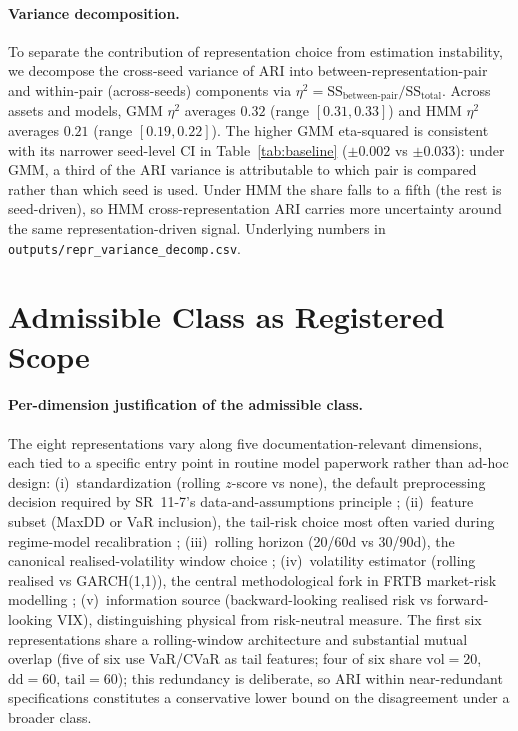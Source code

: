 \documentclass[preprint,12pt,authoryear]{elsarticle}
\begin{document}
\paragraph{Variance decomposition.}
\label{app:variance_decomp}
To separate the contribution of representation choice from estimation instability, we decompose the cross-seed variance of ARI into between-representation-pair and within-pair (across-seeds) components via $\eta^2 = \text{SS}_{\text{between-pair}} / \text{SS}_{\text{total}}$. Across assets and models, GMM $\eta^2$ averages $0.32$ (range $[0.31, 0.33]$) and HMM $\eta^2$ averages $0.21$ (range $[0.19, 0.22]$). The higher GMM eta-squared is consistent with its narrower seed-level CI in Table~\ref{tab:baseline} ($\pm 0.002$ vs $\pm 0.033$): under GMM, a third of the ARI variance is attributable to which pair is compared rather than which seed is used. Under HMM the share falls to a fifth (the rest is seed-driven), so HMM cross-representation ARI carries more uncertainty around the same representation-driven signal. Underlying numbers in \texttt{outputs/repr\_variance\_decomp.csv}.

\section{Admissible Class as Registered Scope}
\label{app:scope}

\paragraph{Per-dimension justification of the admissible class.}
The eight representations vary along five documentation-relevant dimensions, each tied to a specific entry point in routine model paperwork rather than ad-hoc design: (i)~standardization (rolling $z$-score vs none), the default preprocessing decision required by SR~11-7's data-and-assumptions principle \citep{SR117}; (ii)~feature subset (MaxDD or VaR inclusion), the tail-risk choice most often varied during regime-model recalibration \citep{Guidolin2011,RadLowMiffreFaff2023}; (iii)~rolling horizon (20/60d vs 30/90d), the canonical realised-volatility window choice \citep{AngTimmermann2012,Kirby2023FRL}; (iv)~volatility estimator (rolling realised vs GARCH(1,1)), the central methodological fork in FRTB market-risk modelling \citep{BCBSD457,BlazsekKongShadoff2025}; (v)~information source (backward-looking realised risk vs forward-looking VIX), distinguishing physical from risk-neutral measure. The first six representations share a rolling-window architecture and substantial mutual overlap (five of six use VaR/CVaR as tail features; four of six share $\text{vol}=20$, $\text{dd}=60$, $\text{tail}=60$); this redundancy is deliberate, so ARI within near-redundant specifications constitutes a conservative lower bound on the disagreement under a broader class.
\end{document}
